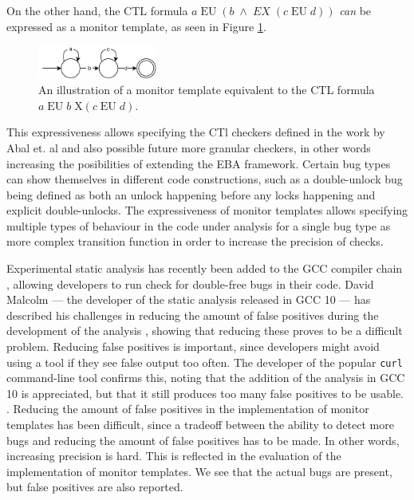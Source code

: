 \newpar On the other hand, the CTL formula $a\;\text{EU}\;(b\;\land\;EX\;(c\;\text{EU}\;d))$ \textit{can} be expressed as a monitor template, as seen in Figure \ref{ctl-as-monitor}. 

\begin{figure}[H]
    \centering
    \includegraphics[width=0.35\textwidth]{evaluation/figures/ctl-as-monitor}
    \caption{An illustration of a monitor template equivalent to the CTL formula $a\;\text{EU}\;b\;\text{X}(c\;\text{EU}\;d)$.}
    \label{ctl-as-monitor}
\end{figure}

\newpar This expressiveness allows specifying the CTl checkers defined in the work by Abal et. al and also possible future more granular checkers, in other words increasing the posibilities of extending the EBA framework. Certain bug types can show themselves in different code constructions, such as a double-unlock bug being defined as both an unlock happening before any locks happening and explicit double-unlocks. The expressiveness of monitor templates allows specifying multiple types of behaviour in the code under analysis for a single bug type as more complex transition function in order to increase the precision of checks.

\newpar Experimental static analysis has recently been added to the GCC compiler chain \cite{gcc10}, allowing developers to run check for double-free bugs in their code. David Malcolm --- the developer of the static analysis released in GCC 10 --- has described his challenges in reducing the amount of false positives during the development of the analysis \cite{gcc10-development}, showing that reducing these proves to be a difficult problem. Reducing false positives is important, since developers might avoid using a tool if they see false output too often. The developer of the popular \texttt{curl} command-line tool confirms this, noting that the addition of the analysis in GCC 10 is appreciated, but that it still produces too many false positives to be usable. \cite{curl-static-analysis}. Reducing the amount of false positives in the implementation of monitor templates has been difficult, since a tradeoff between the ability to detect more bugs and reducing the amount of false positives has to be made. In other words, increasing precision is hard. This is reflected in the evaluation of the implementation of monitor templates. We see that the actual bugs are present, but false positives are also reported. 


